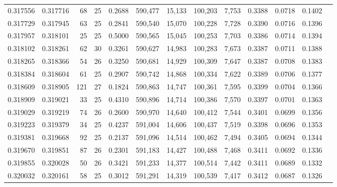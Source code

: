 \begin{tabular}{rrrrrrrrrrrrr}
0.317556 & 0.317716 &  68 &  25 &                                     0.2688 & 590,477 &  15,133 & 100,203 &   7,753 & 0.3388 & 0.0718 & 0.1402 \\
0.317729 & 0.317945 &  63 &  25 &                                     0.2841 & 590,540 &  15,070 & 100,228 &   7,728 & 0.3390 & 0.0716 & 0.1396 \\
0.317957 & 0.318101 &  25 &  25 &                                     0.5000 & 590,565 &  15,045 & 100,253 &   7,703 & 0.3386 & 0.0714 & 0.1394 \\
0.318102 & 0.318261 &  62 &  30 &                                     0.3261 & 590,627 &  14,983 & 100,283 &   7,673 & 0.3387 & 0.0711 & 0.1388 \\
0.318265 & 0.318366 &  54 &  26 &                                     0.3250 & 590,681 &  14,929 & 100,309 &   7,647 & 0.3387 & 0.0708 & 0.1383 \\
0.318384 & 0.318604 &  61 &  25 &                                     0.2907 & 590,742 &  14,868 & 100,334 &   7,622 & 0.3389 & 0.0706 & 0.1377 \\
0.318609 & 0.318905 & 121 &  27 &                                     0.1824 & 590,863 &  14,747 & 100,361 &   7,595 & 0.3399 & 0.0704 & 0.1366 \\
0.318909 & 0.319021 &  33 &  25 &                                     0.4310 & 590,896 &  14,714 & 100,386 &   7,570 & 0.3397 & 0.0701 & 0.1363 \\
0.319029 & 0.319219 &  74 &  26 &                                     0.2600 & 590,970 &  14,640 & 100,412 &   7,544 & 0.3401 & 0.0699 & 0.1356 \\
0.319223 & 0.319379 &  34 &  25 &                                     0.4237 & 591,004 &  14,606 & 100,437 &   7,519 & 0.3398 & 0.0696 & 0.1353 \\
0.319381 & 0.319668 &  92 &  25 &                                     0.2137 & 591,096 &  14,514 & 100,462 &   7,494 & 0.3405 & 0.0694 & 0.1344 \\
0.319670 & 0.319851 &  87 &  26 &                                     0.2301 & 591,183 &  14,427 & 100,488 &   7,468 & 0.3411 & 0.0692 & 0.1336 \\
0.319855 & 0.320028 &  50 &  26 &                                     0.3421 & 591,233 &  14,377 & 100,514 &   7,442 & 0.3411 & 0.0689 & 0.1332 \\
0.320032 & 0.320161 &  58 &  25 &                                     0.3012 & 591,291 &  14,319 & 100,539 &   7,417 & 0.3412 & 0.0687 & 0.1326 \\

\end{tabular}
